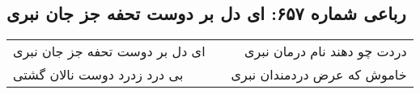 \begin{center}
\section*{رباعی شماره ۶۵۷: ای دل بر دوست تحفه جز جان نبری}
\label{sec:sh657}
\begin{longtable}{l p{0.5cm} r}
ای دل بر دوست تحفه جز جان نبری
&&
دردت چو دهند نام درمان نبری
\\
بی درد زدرد دوست نالان گشتی
&&
خاموش که عرض دردمندان نبری
\\
\end{longtable}
\end{center}

